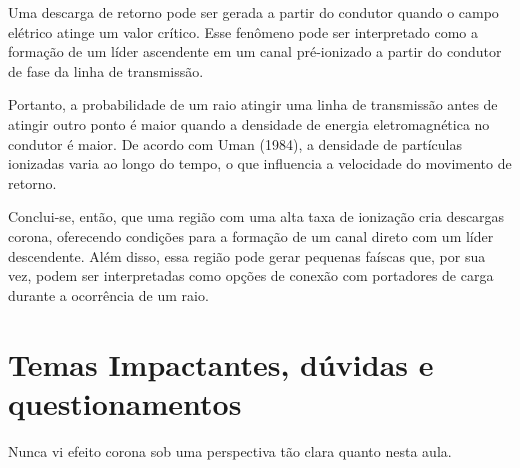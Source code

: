 \documentclass[a4paper, 12pt, onecolumn,singlespacing]{article}
\begin{document}
		Uma descarga de retorno pode ser gerada a partir do condutor quando o campo elétrico atinge um valor crítico. Esse fenômeno pode ser interpretado como a formação de um líder ascendente em um canal pré-ionizado a partir do condutor de fase da linha de transmissão.
		
		Portanto, a probabilidade de um raio atingir uma linha de transmissão antes de atingir outro ponto é maior quando a densidade de energia eletromagnética no condutor é maior. De acordo com Uman (1984), a densidade de partículas ionizadas varia ao longo do tempo, o que influencia a velocidade do movimento de retorno.
		
		Conclui-se, então, que uma região com uma alta taxa de ionização cria descargas corona, oferecendo condições para a formação de um canal direto com um líder descendente. Além disso, essa região pode gerar pequenas faíscas que, por sua vez, podem ser interpretadas como opções de conexão com portadores de carga durante a ocorrência de um raio.

	\section{Temas Impactantes, dúvidas e questionamentos}
	
	Nunca vi efeito corona sob uma perspectiva tão clara quanto nesta aula. 
	
\end{document}

